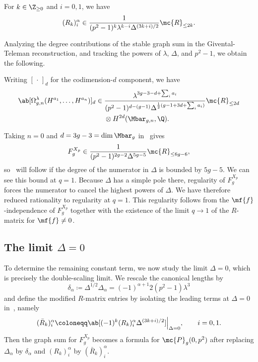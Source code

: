 \begin{prop}%
\label{prop:R matrix polynomiality}
    For \(k \in \Z_{\geq0}\) and \(i = 0,1\), we have
    \[ (R_k)_i^{\alpha} \in \frac{1}{(p^2-1)^k \lambda^{k-i}\Delta^{(3k+i)/2}}\mc{R}_{\leq 2k}. \]
\end{prop}

Analyzing the degree contributions of the stable graph sum in the Givental-Teleman reconstruction, and tracking the powers of \(\lambda\), \(\Delta\), and \(p^2-1\), we obtain the following.

\begin{thm}%
\label{thm:local P1 reconstruction}
    Writing \([\,\cdot\,]_d\) for the codimension-\(d\) component, we have
    \begin{align*}
        \ab[\Omega^{\lambda}_{g,n}(H^{a_1},\ldots,H^{a_n})]_d \in{}& \frac{\lambda^{3g-3-d+\sum_i a_i}}{(p^2-1)^{d-(g-1)}\Delta^{\frac{1}{2}(g-1+3d+\sum_i a_i)}}\mc{R}_{\leq 2d} \\
        &\otimes H^{2d}(\Mbar_{g,n},\Q).
    \end{align*}
\end{thm}

Taking \(n=0\) and \(d = 3g-3 = \dim \Mbar_g\) in~ gives
\[ F_g^{X_p} \in \frac{1}{(p^2-1)^{2g-2}\Delta^{5g-5}}\mc{R}_{\leq 6g-6}, \]
so~ will follow if the degree of the numerator in \(\Delta\) is bounded by \(5g-5\). We can see this bound at \(q=1\). Because \(\Delta\) has a simple pole there, regularity of \(F_g^{X_p}\) forces the numerator to cancel the highest powers of \(\Delta\). We have therefore reduced rationality to regularity at \(q=1\). This regularity follows from the \(\mf{f}\)-independence of \(F_g^{X_p}\) together with the existence of the limit \(q \to 1\) of the \(R\)-matrix for \(\mf{f} \neq 0\).

\subsection{The limit \(\Delta = 0\)}%
\label{sub:The limit Delta = 0}

To determine the remaining constant term, we now study the limit \(\Delta = 0\), which is precisely the double-scaling limit. We rescale the canonical lengths by
\[ \delta_{\alpha} \coloneqq \Delta^{1/2}\Delta_{\alpha} = (-1)^{\alpha+1}2(p^2-1)\lambda^3 \]
and define the modified \(R\)-matrix entries by isolating the leading terms at \(\Delta = 0\) in~, namely
\[ (\bar{R}_k)_i^{\alpha} \coloneqq \ab[(-1)^k (R_k)_i^{\alpha}\Delta^{(3k+i)/2}]\Big|_{\Delta=0}, \qquad i = 0,1. \]
Then the graph sum for \(F_g^{X_p}\) becomes a formula for \(\mc{P}_g(0,p^2)\) after replacing \(\Delta_{\alpha}\) by \(\delta_{\alpha}\) and \((R_k)_i^{\alpha}\) by \((\bar{R}_k)_i^{\alpha}\).

